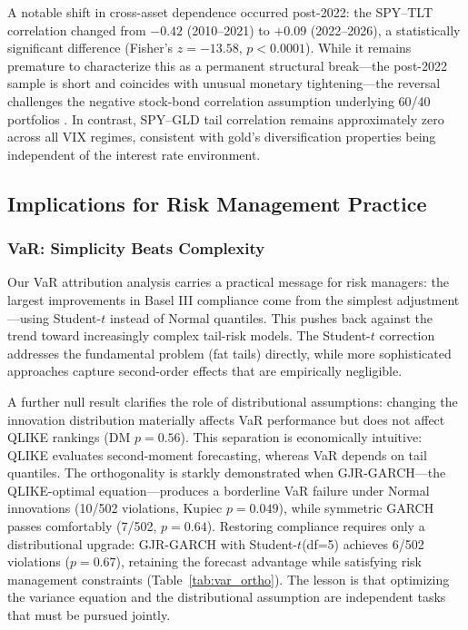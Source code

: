 A notable shift in cross-asset dependence occurred post-2022: the SPY--TLT correlation changed from $-0.42$ (2010--2021) to $+0.09$ (2022--2026), a statistically significant difference (Fisher's $z = -13.58$, $p < 0.0001$). While it remains premature to characterize this as a permanent structural break---the post-2022 sample is short and coincides with unusual monetary tightening---the reversal challenges the negative stock-bond correlation assumption underlying 60/40 portfolios \citep[cf.][]{campbell2017}. In contrast, SPY--GLD tail correlation remains approximately zero across all VIX regimes, consistent with gold's diversification properties being independent of the interest rate environment.

\subsection{Implications for Risk Management Practice}

\subsubsection{VaR: Simplicity Beats Complexity}

Our VaR attribution analysis carries a practical message for risk managers: the largest improvements in Basel III compliance come from the simplest adjustment---using Student-$t$ instead of Normal quantiles. This pushes back against the trend toward increasingly complex tail-risk models. The Student-$t$ correction addresses the fundamental problem (fat tails) directly, while more sophisticated approaches capture second-order effects that are empirically negligible.

A further null result clarifies the role of distributional assumptions: changing the innovation distribution materially affects VaR performance but does not affect QLIKE rankings (DM $p = 0.56$). This separation is economically intuitive: QLIKE evaluates second-moment forecasting, whereas VaR depends on tail quantiles. The orthogonality is starkly demonstrated when GJR-GARCH---the QLIKE-optimal equation---produces a borderline VaR failure under Normal innovations (10/502 violations, Kupiec $p = 0.049$), while symmetric GARCH passes comfortably (7/502, $p = 0.64$). Restoring compliance requires only a distributional upgrade: GJR-GARCH with Student-$t$(df=5) achieves 6/502 violations ($p = 0.67$), retaining the forecast advantage while satisfying risk management constraints (Table~\ref{tab:var_ortho}). The lesson is that optimizing the variance equation and the distributional assumption are independent tasks that must be pursued jointly.

